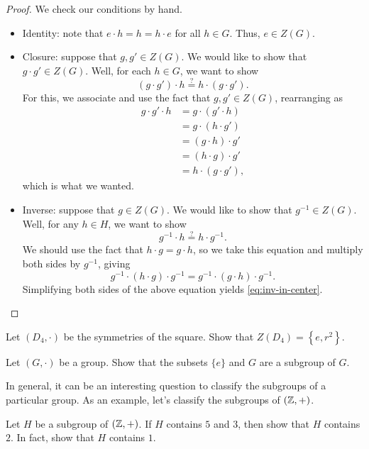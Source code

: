 \documentclass[../main.tex]{subfiles}
\begin{document}
\begin{proof}
    We check our conditions by hand.
    \begin{itemize}
        \item Identity: note that $e\cdot h=h=h\cdot e$ for all $h\in G$. Thus, $e\in Z(G)$.
        \item Closure: suppose that $g,g'\in Z(G)$. We would like to show that $g\cdot g'\in Z(G)$. Well, for each $h\in G$, we want to show
        \[(g\cdot g')\cdot h\stackrel?=h\cdot(g\cdot g').\]
        For this, we associate and use the fact that $g,g'\in Z(G)$, rearranging as
        \begin{align*}
            g\cdot g'\cdot h &= g\cdot (g'\cdot h) \\
            &= g\cdot(h\cdot g') \\
            &= (g\cdot h)\cdot g' \\
            &= (h\cdot g)\cdot g' \\
            &= h\cdot (g\cdot g'),
        \end{align*}
        which is what we wanted.
        \item Inverse: suppose that $g\in Z(G)$. We would like to show that $g^{-1}\in Z(G)$. Well, for any $h\in H$, we want to show
        \begin{equation}
            g^{-1}\cdot h\stackrel?=h\cdot g^{-1}. \label{eq:inv-in-center}
        \end{equation}
        We should use the fact that $h\cdot g=g\cdot h$, so we take this equation and multiply both sides by $g^{-1}$, giving
        \[g^{-1}\cdot(h\cdot g)\cdot g^{-1}=g^{-1}\cdot(g\cdot h)\cdot g^{-1}.\]
        Simplifying both sides of the above equation yields \eqref{eq:inv-in-center}.
        \qedhere
    \end{itemize}
\end{proof}
\begin{exe}
    Let $(D_4,\cdot)$ be the symmetries of the square. Show that $Z(D_4)=\left\{e,r^2\right\}$.
\end{exe}
\begin{exe} \label{exe:easy-subgroups}
    Let $(G,\cdot)$ be a group. Show that the subsets $\{e\}$ and $G$ are a subgroup of $G$.
\end{exe}
In general, it can be an interesting question to classify the subgroups of a particular group. As an example, let's classify the subgroups of $(\mathbb Z,+)$.
\begin{exe}
    Let $H$ be a subgroup of $(\mathbb Z,+)$. If $H$ contains $5$ and $3$, then show that $H$ contains $2$. In fact, show that $H$ contains $1$.
\end{exe}
\end{document}
